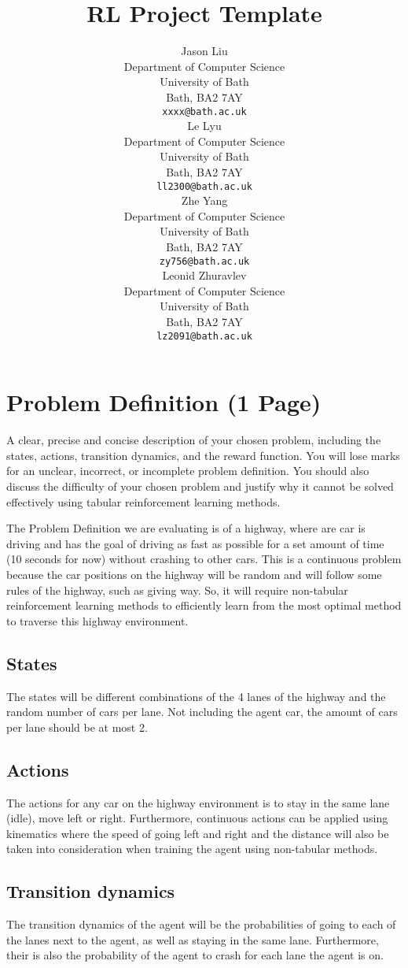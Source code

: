 \documentclass{article}
\title{RL Project Template}
\author{
  Jason Liu \\
  Department of Computer Science \\
  University of Bath \\
  Bath, BA2 7AY \\
  \texttt{xxxx@bath.ac.uk} \\
  \And
  Le Lyu \\
  Department of Computer Science \\
  University of Bath \\
  Bath, BA2 7AY \\
  \texttt{ll2300@bath.ac.uk} \\
  \And
  Zhe Yang \\
  Department of Computer Science \\
  University of Bath \\
  Bath, BA2 7AY \\
  \texttt{zy756@bath.ac.uk} \\
  \And
  Leonid Zhuravlev \\
  Department of Computer Science \\
  University of Bath \\
  Bath, BA2 7AY \\
  \texttt{lz2091@bath.ac.uk} \\
}
\begin{document}
\maketitle


\section{Problem Definition (1 Page)}
A clear, precise and concise description of your chosen problem, including the states, actions, transition dynamics, and the reward function. You will lose marks for an unclear, incorrect, or incomplete problem definition. You should also discuss
the difficulty of your chosen problem and justify why it cannot be solved effectively using tabular reinforcement learning methods.


The Problem Definition we are evaluating is of a highway, where are car is driving and has the goal of driving as fast as possible for a set amount of time (10 seconds for now) without crashing to other cars. This is a continuous problem because the car positions on the highway will be random and will follow some rules of the highway, such as giving way. So, it will require non-tabular reinforcement learning methods to efficiently learn from the most optimal method to traverse this highway environment.

\subsection{States}
The states will be different combinations of the 4 lanes of the highway and the random number of cars per lane. Not including the agent car, the amount of cars per lane should be at most 2.

\subsection{Actions}
The actions for any car on the highway environment is to stay in the same lane (idle), move left or right. Furthermore, continuous actions can be applied using kinematics where the speed of going left and right and the distance will also be taken into consideration when training the agent using non-tabular methods.

\subsection{Transition dynamics}
The transition dynamics of the agent will be the probabilities of going to each of the lanes next to the agent, as well as staying in the same lane. Furthermore, their is also the probability of the agent to crash for each lane the agent is on.
\end{document}
